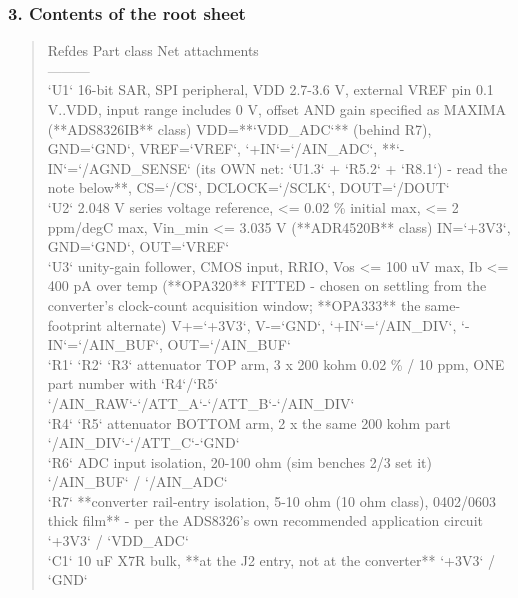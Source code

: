 \documentclass[11pt,a4paper]{article}
\begin{document}
\subsubsection*{3. Contents of the root sheet}
\begin{quote}\small\ttfamily\raggedright
\textbar{} Refdes \textbar{} Part class \textbar{} Net attachments \textbar{}\\
\textbar{}---\textbar{}---\textbar{}---\textbar{}\\
\textbar{} `U1` \textbar{} 16-bit SAR, SPI peripheral, VDD 2.7-3.6 V, external VREF pin 0.1 V..VDD, input range includes 0 V, offset AND gain specified as MAXIMA ({*}{*}ADS8326IB{*}{*} class) \textbar{} VDD={*}{*}`VDD\_ADC`{*}{*} (behind R7), GND=`GND`, VREF=`VREF`, `+IN`=`/AIN\_ADC`, {*}{*}`-IN`=`/AGND\_SENSE` (its OWN net: `U1.3` + `R5.2` + `R8.1`) - read the note below{*}{*}, CS=`/CS`, DCLOCK=`/SCLK`, DOUT=`/DOUT` \textbar{}\\
\textbar{} `U2` \textbar{} 2.048 V series voltage reference, \textless{}= 0.02 \% initial max, \textless{}= 2 ppm/degC max, Vin\_min \textless{}= 3.035 V ({*}{*}ADR4520B{*}{*} class) \textbar{} IN=`+3V3`, GND=`GND`, OUT=`VREF` \textbar{}\\
\textbar{} `U3` \textbar{} unity-gain follower, CMOS input, RRIO, Vos \textless{}= 100 uV max, Ib \textless{}= 400 pA over temp ({*}{*}OPA320{*}{*} FITTED - chosen on settling from the converter's clock-count acquisition window; {*}{*}OPA333{*}{*} the same-footprint alternate) \textbar{} V+=`+3V3`, V-=`GND`, `+IN`=`/AIN\_DIV`, `-IN`=`/AIN\_BUF`, OUT=`/AIN\_BUF` \textbar{}\\
\textbar{} `R1` `R2` `R3` \textbar{} attenuator TOP arm, 3 x 200 kohm 0.02 \% / 10 ppm, ONE part number with `R4`/`R5` \textbar{} `/AIN\_RAW`-`/ATT\_A`-`/ATT\_B`-`/AIN\_DIV` \textbar{}\\
\textbar{} `R4` `R5` \textbar{} attenuator BOTTOM arm, 2 x the same 200 kohm part \textbar{} `/AIN\_DIV`-`/ATT\_C`-`GND` \textbar{}\\
\textbar{} `R6` \textbar{} ADC input isolation, 20-100 ohm (sim benches 2/3 set it) \textbar{} `/AIN\_BUF` / `/AIN\_ADC` \textbar{}\\
\textbar{} `R7` \textbar{} {*}{*}converter rail-entry isolation, 5-10 ohm (10 ohm class), 0402/0603 thick film{*}{*} - per the ADS8326's own recommended application circuit \textbar{} `+3V3` / `VDD\_ADC` \textbar{}\\
\textbar{} `C1` \textbar{} 10 uF X7R bulk, {*}{*}at the J2 entry, not at the converter{*}{*} \textbar{} `+3V3` / `GND` \textbar{}\\

\end{quote}
\end{document}
